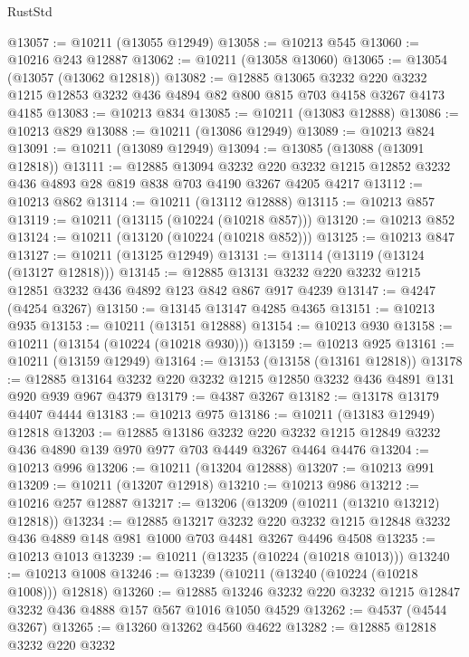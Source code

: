 \begin{lexlean}{RustStd}
\begin{coremodule}
@13057 := @10211 (@13055 @12949)
@13058 := @10213 @545
@13060 := @10216 @243 @12887
@13062 := @10211 (@13058 @13060)
@13065 := @13054 (@13057 (@13062 @12818))
@13082 := @12885
    @13065
    @3232
    @220
    @3232
    @1215
    @12853
    @3232
    @436
    @4894
    @82
    @800
    @815
    @703
    @4158
    @3267
    @4173
    @4185
@13083 := @10213 @834
@13085 := @10211 (@13083 @12888)
@13086 := @10213 @829
@13088 := @10211 (@13086 @12949)
@13089 := @10213 @824
@13091 := @10211 (@13089 @12949)
@13094 := @13085 (@13088 (@13091 @12818))
@13111 := @12885
    @13094
    @3232
    @220
    @3232
    @1215
    @12852
    @3232
    @436
    @4893
    @28
    @819
    @838
    @703
    @4190
    @3267
    @4205
    @4217
@13112 := @10213 @862
@13114 := @10211 (@13112 @12888)
@13115 := @10213 @857
@13119 := @10211 (@13115 (@10224 (@10218 @857)))
@13120 := @10213 @852
@13124 := @10211 (@13120 (@10224 (@10218 @852)))
@13125 := @10213 @847
@13127 := @10211 (@13125 @12949)
@13131 := @13114 (@13119 (@13124 (@13127 @12818)))
@13145 := @12885 @13131 @3232 @220 @3232 @1215 @12851 @3232 @436 @4892 @123 @842 @867 @917 @4239
@13147 := @4247 (@4254 @3267)
@13150 := @13145 @13147 @4285 @4365
@13151 := @10213 @935
@13153 := @10211 (@13151 @12888)
@13154 := @10213 @930
@13158 := @10211 (@13154 (@10224 (@10218 @930)))
@13159 := @10213 @925
@13161 := @10211 (@13159 @12949)
@13164 := @13153 (@13158 (@13161 @12818))
@13178 := @12885 @13164 @3232 @220 @3232 @1215 @12850 @3232 @436 @4891 @131 @920 @939 @967 @4379
@13179 := @4387 @3267
@13182 := @13178 @13179 @4407 @4444
@13183 := @10213 @975
@13186 := @10211 (@13183 @12949) @12818
@13203 := @12885
    @13186
    @3232
    @220
    @3232
    @1215
    @12849
    @3232
    @436
    @4890
    @139
    @970
    @977
    @703
    @4449
    @3267
    @4464
    @4476
@13204 := @10213 @996
@13206 := @10211 (@13204 @12888)
@13207 := @10213 @991
@13209 := @10211 (@13207 @12918)
@13210 := @10213 @986
@13212 := @10216 @257 @12887
@13217 := @13206 (@13209 (@10211 (@13210 @13212) @12818))
@13234 := @12885
    @13217
    @3232
    @220
    @3232
    @1215
    @12848
    @3232
    @436
    @4889
    @148
    @981
    @1000
    @703
    @4481
    @3267
    @4496
    @4508
@13235 := @10213 @1013
@13239 := @10211 (@13235 (@10224 (@10218 @1013)))
@13240 := @10213 @1008
@13246 := @13239 (@10211 (@13240 (@10224 (@10218 @1008))) @12818)
@13260 := @12885 @13246 @3232 @220 @3232 @1215 @12847 @3232 @436 @4888 @157 @567 @1016 @1050 @4529
@13262 := @4537 (@4544 @3267)
@13265 := @13260 @13262 @4560 @4622
@13282 := @12885
    @12818
    @3232
    @220
    @3232

\end{coremodule}
\end{lexlean}
